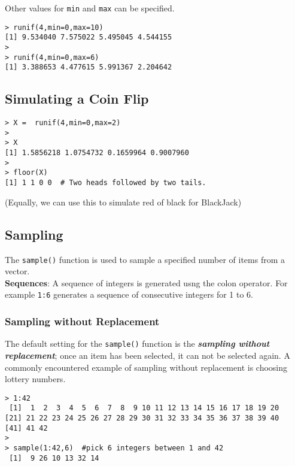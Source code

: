 Other values for \texttt{min} and \texttt{max} can be specified.
\begin{framed}
\begin{verbatim}
> runif(4,min=0,max=10)
[1] 9.534040 7.575022 5.495045 4.544155
>
> runif(4,min=0,max=6)
[1] 3.388653 4.477615 5.991367 2.204642
\end{verbatim}
\end{framed}
\subsection{Simulating a Coin Flip}

\begin{framed}
\begin{verbatim}
> X =  runif(4,min=0,max=2)
>
> X
[1] 1.5856218 1.0754732 0.1659964 0.9007960
>
> floor(X)
[1] 1 1 0 0  # Two heads followed by two tails.
\end{verbatim}
\end{framed}


(Equally, we can use this to simulate red of black for BlackJack)
\subsection{Sampling}
The \texttt{sample()} function is used to sample a specified number
of items from a vector.\\

\bigskip
\noindent \textbf{Sequences}: A sequence of integers is generated usng the colon operator. For example \texttt{1:6} generates a sequence of consecutive integers for 1 to 6.

\subsubsection{Sampling without Replacement}
The default setting for the \texttt{sample()} function is the
\textbf{\textit{sampling without replacement}}; once an item has been selected, it can not be selected again. A commonly encountered example of sampling without replacement is choosing lottery numbers.
\begin{framed}
\begin{verbatim}
> 1:42
 [1]  1  2  3  4  5  6  7  8  9 10 11 12 13 14 15 16 17 18 19 20
[21] 21 22 23 24 25 26 27 28 29 30 31 32 33 34 35 36 37 38 39 40
[41] 41 42
> 
> sample(1:42,6)  #pick 6 integers between 1 and 42
 [1]  9 26 10 13 32 14
\end{verbatim}
\end{framed}


